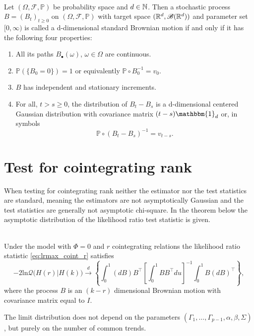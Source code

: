 \begin{defi}\phantom{}\\
    Let $(\Omega, \mathscr{F}, \mathbb{P})$ be probability space and $d\in \mathbb{N}$. Then a stochastic process $B=(B_t)_{t\geq0}$ on $(\Omega, \mathscr{F}, \mathbb{P})$ with target space $(\mathbb{R}^d,\mathscr{B}(\mathbb{R}^d))$ and parameter set $[0,\infty)$ is called a d-dimensional standard Brownian motion if and only if it has the following four properties:
    
\renewcommand{\labelenumi}{\roman{enumi}.}
\begin{enumerate}
     \item All its paths $B_\bullet(\omega)$, $\omega\in\Omega$ are continuous.
     \item $\mathbb{P}(\{B_0=0\})=1$ or equivalently $\mathbb{P}\circ B_0^{-1}=v_0$.
     \item $B$ has independent and stationary increments.        
     \item  For all, $t > s \geq 0 $, the distribution of $B_t-B_s$ is a d-dimensional centered Gaussian distribution with covariance matrix $(t-s) \mathbbm{1}_d$ or, in symbols 
     \begin{equation*}
         \mathbb{P}\circ (B_t-B_s)^{-1}=v_{t-s}.
     \end{equation*}
\end{enumerate}
\end{defi}


\section{Test for cointegrating rank}
When testing for cointegrating rank neither the estimator nor the test statistics are standard, meaning the estimators are not asymptotically Gaussian and the test statistics are generally not asymptotic chi-square. In the theorem below the asymptotic distribution of the likelihood ratio test statistic is given.

\begin{thm}\phantom\\
    Under the model with $\Phi=0$ and $r$ cointegrating relations the likelihood ratio statistic \eqref{eq:lrmax_coint_r} satisfies
    \begin{equation*}
        -2 \text{ln}\mathcal{Q} \big( H(r)|H(k) \big) \overset{d}{\rightarrow} \left\{ \int_0^1 (dB)B^{\top} \left[\int_0^1 BB^\top du \right]^{-1} \int_0^1 B(dB)^\top \right\},
    \end{equation*}
    where the process $B$ is an $(k-r)$ dimensional Brownian motion with covariance matrix equal to $I.$
    \label{thm:asymptotic_distribution}
\end{thm}
\noindent The limit distribution does not depend on the parameters $(\Gamma_1,\ldots,\Gamma_{p-1},\alpha,\beta,\Sigma)$, but purely on the number of common trends.

